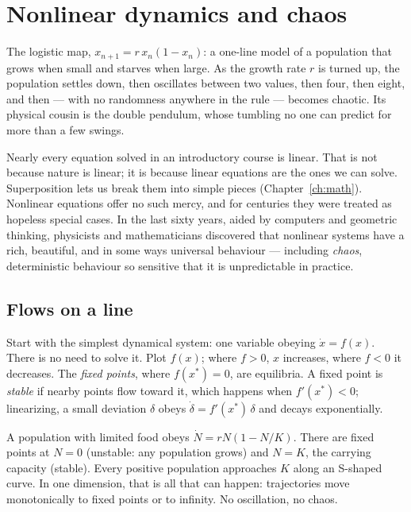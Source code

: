 \chapter{Nonlinear dynamics and chaos}
\label{ch:chaos}



\begin{prototype}
The logistic map, $x_{n+1} = r\,x_n(1 - x_n)$: a one-line model of a population that grows when small and starves when large. As the growth rate $r$ is turned up, the population settles down, then oscillates between two values, then four, then eight, and then --- with no randomness anywhere in the rule --- becomes chaotic. Its physical cousin is the double pendulum, whose tumbling no one can predict for more than a few swings.
\end{prototype}

Nearly every equation solved in an introductory course is linear. That is not because nature is linear; it is because linear equations are the ones we can solve. Superposition lets us break them into simple pieces (Chapter~\ref{ch:math}). Nonlinear equations offer no such mercy, and for centuries they were treated as hopeless special cases. In the last sixty years, aided by computers and geometric thinking, physicists and mathematicians discovered that nonlinear systems have a rich, beautiful, and in some ways universal behaviour --- including \emph{chaos}, deterministic behaviour so sensitive that it is unpredictable in practice.

\section{Flows on a line}

Start with the simplest dynamical system: one variable obeying $\dot x = f(x)$. There is no need to solve it. Plot $f(x)$; where $f>0$, $x$ increases, where $f<0$ it decreases. The \emph{fixed points}, where $f(x^*) = 0$, are equilibria. A fixed point is \emph{stable} if nearby points flow toward it, which happens when $f'(x^*) <0$; linearizing, a small deviation $\delta$ obeys $\dot\delta = f'(x^*)\,\delta$ and decays exponentially.

\begin{example}
A population with limited food obeys $\dot N = rN(1 - N/K)$. There are fixed points at $N=0$ (unstable: any population grows) and $N = K$, the carrying capacity (stable). Every positive population approaches $K$ along an S-shaped curve. In one dimension, that is all that can happen: trajectories move monotonically to fixed points or to infinity. No oscillation, no chaos.
\end{example}

